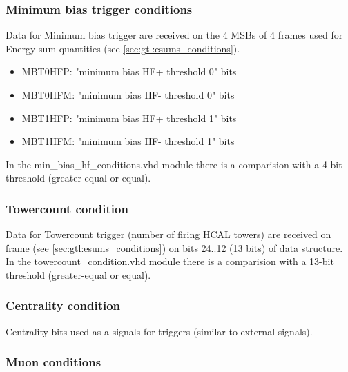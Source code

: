 \subsubsection{Minimum bias trigger conditions}
\label{sec:gtl:min_bias_conditions}

Data for Minimum bias trigger are received on the 4 MSBs of 4 frames used for Energy sum quantities (see \ref{sec:gtl:esums_conditions}). 

\begin{itemize}
\item MBT0HFP: "minimum bias HF+ threshold 0" bits
\item MBT0HFM: "minimum bias HF- threshold 0" bits
\item MBT1HFP: "minimum bias HF+ threshold 1" bits
\item MBT1HFM: "minimum bias HF- threshold 1" bits
\end{itemize}

In the min\_bias\_hf\_conditions.vhd module there is a comparision with a 4-bit threshold (greater-equal or equal).

\subsubsection{Towercount condition}
\label{sec:gtl:towercount_cond}

Data for Towercount trigger (number of firing HCAL towers) are received on frame \htt (see \ref{sec:gtl:esums_conditions}) on bits 24..12 (13 bits) of \htt data structure. 
In the towercount\_condition.vhd module there is a comparision with a 13-bit threshold (greater-equal or equal).

\subsubsection{Centrality condition}
\label{sec:gtl:centrality_cond}

Centrality bits used as a signals for triggers (similar to external signals).

\subsubsection{Muon conditions}
\label{sec:gtl:muon_conditions}

